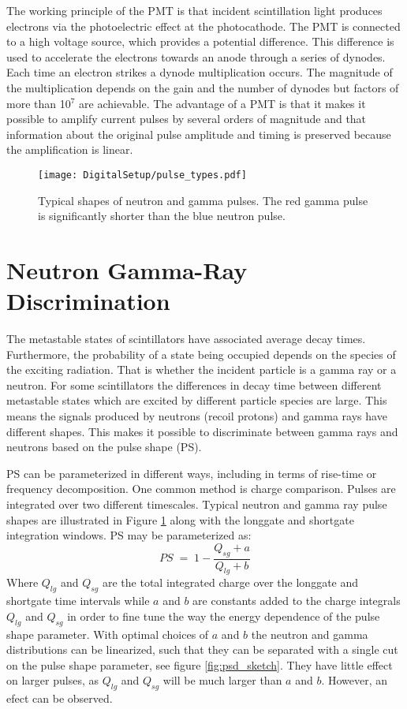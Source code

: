 \documentclass[main.tex]{subfiles}
\begin{document}
The working principle of the PMT is that incident scintillation light produces electrons via the photoelectric effect at the photocathode. The PMT is connected to a high voltage source, which provides a potential difference. This difference is used to accelerate the electrons towards an anode through a series of dynodes. Each time an electron strikes a dynode multiplication occurs. The magnitude of the multiplication depends on the gain and the number of dynodes but factors of more than 10$^\text{7}$ are achievable. 
The advantage of a PMT is that it makes it possible to amplify current pulses by several orders of magnitude and that information about the original pulse amplitude and timing is preserved because the amplification is linear.



\begin{figure}[ht]
	\centering
    	\texttt{[image: DigitalSetup/pulse\_types.pdf]}
        \caption{Typical shapes of neutron and gamma pulses. The red gamma pulse is significantly shorter than the blue neutron pulse.}
	    \label{fig:pulse_types} 
\end{figure}
\section{Neutron Gamma-Ray Discrimination}
The metastable states of scintillators have associated average decay times. Furthermore, the probability of a state being occupied depends on the species of the exciting radiation\cite{Krane}. That is whether the incident particle is a gamma ray or a neutron. For some scintillators the differences in decay time between different metastable states which are excited by different particle species are large. This means the signals produced by neutrons (recoil protons) and gamma rays have different shapes. This makes it possible to discriminate between gamma rays and neutrons based on the pulse shape (PS). 

PS can be parameterized in different ways, including in terms of rise-time or frequency decomposition. One common method is charge comparison. Pulses are integrated over two different timescales. Typical neutron and gamma ray pulse shapes are illustrated in Figure \ref{fig:pulse_types} along with the longgate and shortgate integration windows. PS may be parameterized as:
\begin{equation}
	PS \; = \; 1-\frac{Q_{sg} + a}{Q_{lg} + b}
	\label{eq:ps}
\end{equation}
Where $Q_{lg}$ and $Q_{sg}$ are the total integrated charge over the longgate and shortgate time intervals while $a$ and $b$ are constants added to the charge integrals $Q_{lg}$ and $Q_{sg}$ in order to fine tune the way the energy dependence of the pulse shape parameter. With optimal choices of $a$ and $b$ the neutron and gamma distributions can be linearized, such that they can be separated with a single cut on the pulse shape parameter, see figure \ref{fig:psd_sketch}. They have little effect on larger pulses, as $Q_{lg}$ and $Q_{sg}$ will be much larger than $a$ and $b$. However, an efect can be observed.
\end{document}

